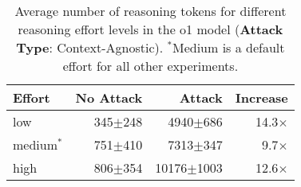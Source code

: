 

\begin{table}[t]


\vskip 0.15in
\begin{center}
\begin{small}
\begin{sc}
\begin{tabular}{lrrr}
  \toprule
  Effort & No Attack & Attack & Increase \\
  \midrule
  low     & 345$\pm$248 & 4940$\pm$686 & 14.3$\times$ \\
  medium$^*$ & 751$\pm$410 & 7313$\pm$347 & 9.7$\times$ \\
  high & 806$\pm$354 & 10176$\pm$1003 & 12.6$\times$ \\
  \bottomrule
\end{tabular}
\end{sc}
\end{small}
\end{center}
\vskip -0.1in
\caption{Average number of reasoning tokens for different reasoning effort levels in the o1 model (\textbf{Attack Type}: Context-Agnostic). $^*$Medium is a default effort for all other experiments.}
\label{tab:effort_comparison}
\end{table}

